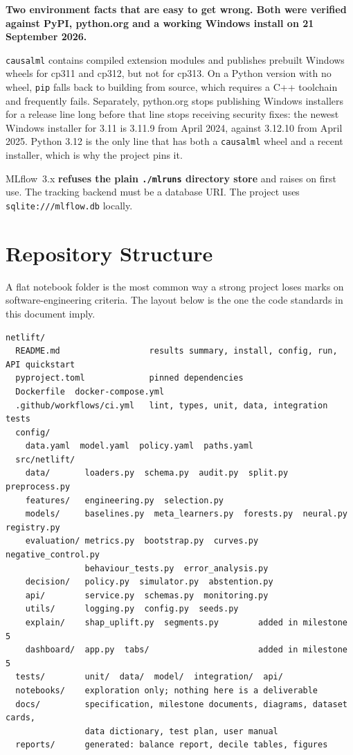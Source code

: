 \documentclass[11pt,a4paper]{article}
\begin{document}
\begin{keybox}
\textbf{Two environment facts that are easy to get wrong. Both were verified against PyPI,
python.org and a working Windows install on 21 September 2026.}

\texttt{causalml} contains compiled extension modules and publishes prebuilt Windows wheels for
cp311 and cp312, but not for cp313. On a Python version with no wheel, \texttt{pip} falls back to
building from source, which requires a C++ toolchain and frequently fails. Separately, python.org
stops publishing Windows installers for a release line long before that line stops receiving
security fixes: the newest Windows installer for 3.11 is 3.11.9 from April 2024, against 3.12.10
from April 2025. Python 3.12 is the only line that has both a \texttt{causalml} wheel and a recent
installer, which is why the project pins it.

MLflow~3.x \textbf{refuses the plain \texttt{./mlruns} directory store} and raises on first use. The
tracking backend must be a database URI. The project uses \texttt{sqlite:///mlflow.db} locally.
\end{keybox}

\section{Repository Structure}

A flat notebook folder is the most common way a strong project loses marks on software-engineering
criteria. The layout below is the one the code standards in this document imply.

{\footnotesize
\begin{verbatim}
netlift/
  README.md                  results summary, install, config, run, API quickstart
  pyproject.toml             pinned dependencies
  Dockerfile  docker-compose.yml
  .github/workflows/ci.yml   lint, types, unit, data, integration tests
  config/
    data.yaml  model.yaml  policy.yaml  paths.yaml
  src/netlift/
    data/       loaders.py  schema.py  audit.py  split.py  preprocess.py
    features/   engineering.py  selection.py
    models/     baselines.py  meta_learners.py  forests.py  neural.py  registry.py
    evaluation/ metrics.py  bootstrap.py  curves.py  negative_control.py
                behaviour_tests.py  error_analysis.py
    decision/   policy.py  simulator.py  abstention.py
    api/        service.py  schemas.py  monitoring.py
    utils/      logging.py  config.py  seeds.py
    explain/    shap_uplift.py  segments.py        added in milestone 5
    dashboard/  app.py  tabs/                      added in milestone 5
  tests/        unit/  data/  model/  integration/  api/
  notebooks/    exploration only; nothing here is a deliverable
  docs/         specification, milestone documents, diagrams, dataset cards,
                data dictionary, test plan, user manual
  reports/      generated: balance report, decile tables, figures
\end{verbatim}}
\end{document}
